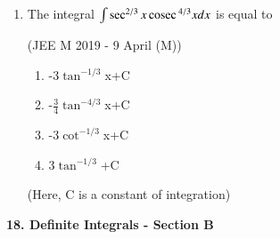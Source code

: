 \documentclass[journal,12pt,twocolumn]{IEEEtran}
\theoremstyle{remark}
\begin{document}
\begin{enumerate}[label=\textcolor{black}{\arabic*.}]
	\item The integral $\int \sec ^{2/3}x\,\text{cosec}\, ^{4/3}x dx$ is equal to

		\hfill{(JEE M 2019 - 9 April (M))}

		\begin{multicols}{2}
			\begin{enumerate}[label=(\alph*)]
				\item -3$\tan ^{-1/3}$x+C
				\item -$\frac{3}{4}\tan ^{-4/3}$x+C
				\item -3$\cot ^{-1/3}$x+C
				\item 3$\tan ^{-1/3}$+C
			\end{enumerate}
		\end{multicols}
		(Here, C is a constant of integration)
\end{enumerate}

\maketitle\large{\textbf{18. Definite Integrals - Section B}}\small
\end{document}
